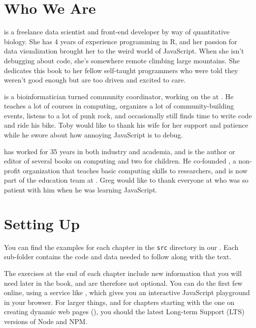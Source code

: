 \section{Who We Are}\label{s:intro-contributors}

\textbf{}
is a freelance data scientist and front-end developer by way of quantitative biology. 
She has 4 years of experience programming in R, 
and her passion for data visualization brought her to the weird world of JavaScript. 
When she isn't debugging  about code, 
she's somewhere remote climbing large mountains. 
She dedicates this book to her fellow self-taught programmers who were told they weren't good enough
but are too driven and excited to care.

\textbf{} is a bioinformatician turned community
coordinator, working on the  at
. He teaches a lot of courses in computing, organizes
a lot of community-building events, listens to a lot of punk rock, and
occasionally still finds time to write code and ride his bike. Toby would like
to thank his wife for her support and patience while he swore about how annoying
JavaScript is to debug.

\textbf{} has worked for 35 years in both industry and
academia, and is the author or editor of several books on computing and two for
children. He co-founded , a non-profit
organization that teaches basic computing skills to researchers, and is now part
of the education team at . Greg would like to
thank everyone at  who was so patient with him when
he was learning JavaScript.

\section{Setting Up}\label{s:intro-setup}

You can find the examples for each chapter in the \texttt{src} directory
in our .
Each sub-folder contains the code and data needed to follow along with the text.

The exercises at the end of each chapter include new information
that you will need later in the book,
and are therefore not optional.
You can do the first few online,
using a service like ,
which gives you an interactive JavaScript playground in your browser.
For larger things,
and for chapters starting with the one on creating dynamic web pages (),
you should  the latest Long-term Support (LTS) versions of Node and NPM.

